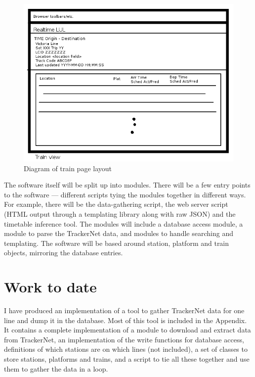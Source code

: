 \documentclass[a4paper,12pt]{article}
\begin{document}
\begin{figure}[h]
  \centering
  \includegraphics[width=\linewidth]{screen3}
  \caption{Diagram of train page layout}
  \label{fig:screen3}
\end{figure}

The software itself will be split up into modules. There will be a few entry
points to the software --- different scripts tying the modules together in
different ways. For example, there will be the data-gathering script, the web
server script (HTML output through a templating library along with raw JSON)
and the timetable inference tool. The modules will include a database access
module, a module to parse the TrackerNet data, and modules to handle searching
and templating. The software will be based around station, platform and train
objects, mirroring the database entries.

\section{Work to date}

I have produced an implementation of a tool to gather TrackerNet data for one
line and dump it in the database. Most of this tool is included in the
Appendix. It contains a complete implementation of a module to download and
extract data from TrackerNet, an implementation of the write functions for
database access, definitions of which stations are on which lines (not
included), a set of classes to store stations, platforms and trains, and a
script to tie all these together and use them to gather the data in a loop.
\end{document}
